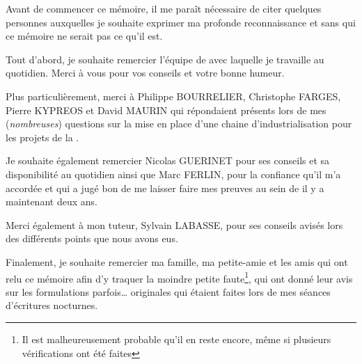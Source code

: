 \vfill

{\large 

Avant de commencer ce mémoire, il me paraît nécessaire de citer quelques personnes auxquelles je souhaite exprimer ma profonde reconnaissance et sans qui ce mémoire ne serait pas ce qu'il est.

Tout d’abord, je souhaite remercier l'équipe \naq{} de \onepoint{} avec laquelle je travaille au quotidien. Merci à vous pour vos conseils et votre bonne humeur.

Plus particulièrement, merci à Philippe BOURRELIER, Christophe FARGES, Pierre KYPREOS et David MAURIN qui répondaient présents lors de mes (\textit{nombreuses}) questions sur la mise en place d'une chaine d'industrialisation pour les projets de la \naq.

Je souhaite également remercier Nicolas GUERINET pour ses conseils et sa disponibilité au quotidien ainsi que Marc FERLIN, pour la confiance qu’il m’a accordée et qui a jugé bon de me laisser faire mes preuves au sein de \onepoint{} il y a maintenant deux ans.

Merci également à mon tuteur, Sylvain LABASSE, pour ses conseils avisés lors des différents points que nous avons eus.

Finalement, je souhaite remercier ma famille, ma petite-amie et les amis qui ont relu ce mémoire afin d'y traquer la moindre petite faute\footnote{Il est malheureusement probable qu'il en reste encore, même si plusieurs vérifications ont été faites}, qui ont donné leur avis sur les formulations parfois\ldots{} originales qui étaient faites lors de mes séances d'écritures nocturnes.

}


\vfill